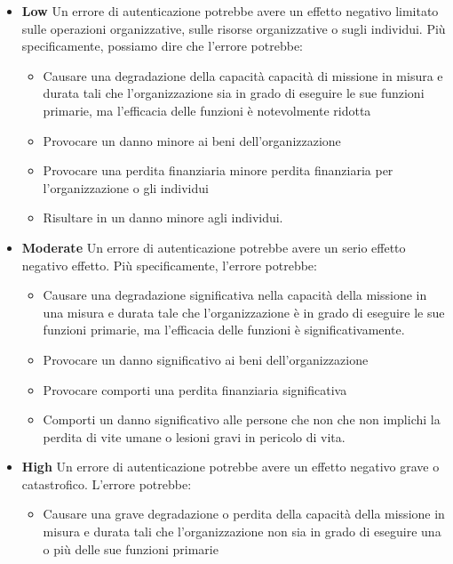 \begin{itemize}
    \item \textbf{Low} Un errore di autenticazione potrebbe avere un effetto negativo limitato sulle operazioni organizzative, sulle risorse organizzative o sugli individui. Più specificamente, possiamo dire che l'errore potrebbe:
    
    \begin{itemize}
        \item Causare una degradazione della capacità capacità di missione in misura e durata tali che l'organizzazione sia in grado di eseguire le sue funzioni primarie, ma l'efficacia delle funzioni è notevolmente ridotta
        
        \item Provocare un danno minore ai beni dell'organizzazione
        
        \item Provocare una perdita finanziaria minore perdita finanziaria per l'organizzazione o gli individui
        
        \item Risultare in un danno minore agli individui.
    \end{itemize}
    
    \item \textbf{Moderate} Un errore di autenticazione potrebbe avere un serio effetto negativo effetto. Più specificamente, l'errore potrebbe:
    
    \begin{itemize}
        \item Causare una degradazione significativa nella capacità della missione in una misura e durata tale che l'organizzazione è in grado di eseguire le sue funzioni primarie, ma l'efficacia delle funzioni è significativamente.
        
        \item Provocare un danno significativo ai beni dell'organizzazione
        
        \item Provocare comporti una perdita finanziaria significativa
        
        \item Comporti un danno significativo alle persone che non che non implichi la perdita di vite umane o lesioni gravi in pericolo di vita.
    \end{itemize}
    \item \textbf{High}
    Un errore di autenticazione potrebbe avere un effetto negativo grave o catastrofico. L'errore potrebbe:
    \begin{itemize}
        \item Causare una grave degradazione o perdita della capacità della missione in misura e durata tali che l'organizzazione non sia in grado di eseguire una o più delle sue funzioni primarie
        

\end{itemize}
\end{itemize}
